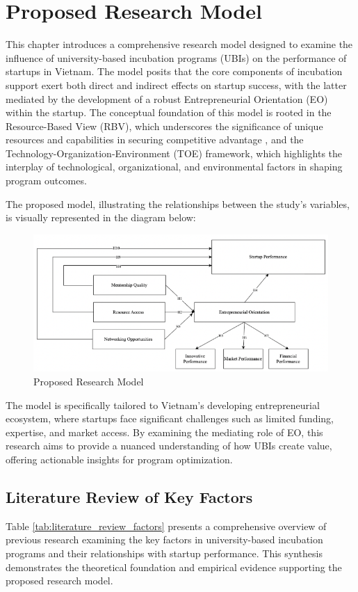 \documentclass[../Main.tex]{subfiles}
\begin{document}
	\section{Proposed Research Model}
    This chapter introduces a comprehensive research model designed to examine the influence of university-based incubation programs (UBIs) on the performance of startups in Vietnam. The model posits that the core components of incubation support exert both direct and indirect effects on startup success, with the latter mediated by the development of a robust Entrepreneurial Orientation (EO) within the startup. The conceptual foundation of this model is rooted in the Resource-Based View (RBV), which underscores the significance of unique resources and capabilities in securing competitive advantage \cite{barney1991firm}, and the Technology-Organization-Environment (TOE) framework, which highlights the interplay of technological, organizational, and environmental factors in shaping program outcomes.

    The proposed model, illustrating the relationships between the study's variables, is visually represented in the diagram below:
    \begin{figure}[H]
        \centering
        \includegraphics[width=\textwidth]{Figure/research_model.png}
        \caption{Proposed Research Model}
        \label{fig:research_model}
    \end{figure}

    The model is specifically tailored to Vietnam's developing entrepreneurial ecosystem, where startups face significant challenges such as limited funding, expertise, and market access. By examining the mediating role of EO, this research aims to provide a nuanced understanding of how UBIs create value, offering actionable insights for program optimization.

    \subsection{Literature Review of Key Factors}
    Table \ref{tab:literature_review_factors} presents a comprehensive overview of previous research examining the key factors in university-based incubation programs and their relationships with startup performance. This synthesis demonstrates the theoretical foundation and empirical evidence supporting the proposed research model.
\end{document}
